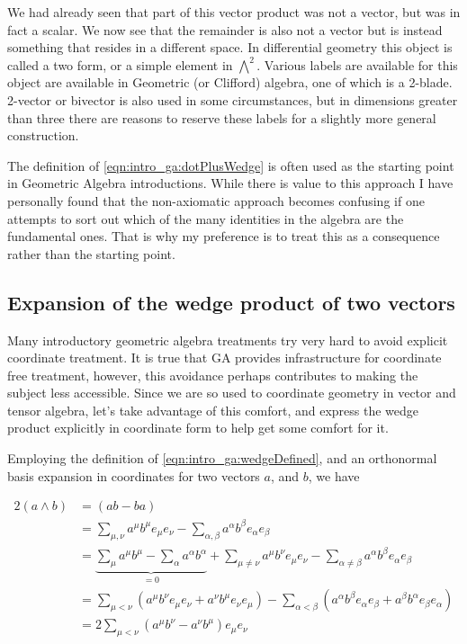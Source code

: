 We had already seen that part of this vector product was not a vector, but was in fact a scalar.  We now see that the remainder is also not a vector but is instead something that resides in a different space.  In differential geometry this object is called a two form, or a simple element in $\bigwedge^2$.  Various labels are available for this object are available in Geometric (or Clifford) algebra, one of which is a 2-blade.  2-vector or bivector is also used in some circumstances, but in dimensions greater than three there are reasons to reserve these labels for a slightly more general construction.

The definition of \ref{eqn:intro_ga:dotPlusWedge} is often used as the starting point in Geometric Algebra introductions.  While there is value to this approach I have personally found that the non-axiomatic approach becomes confusing if one attempts to sort out which of the many identities in the algebra are the fundamental ones.  That is why my preference is to treat this as a consequence rather than the starting point.

\subsection{Expansion of the wedge product of two vectors }

Many introductory geometric algebra treatments try very hard to avoid explicit coordinate treatment.  It is true that GA provides infrastructure for coordinate free treatment, however, this avoidance perhaps contributes to making the subject less accessible.  Since we are so used to coordinate geometry in vector and tensor algebra, let's take advantage of this comfort, and express the wedge product explicitly in coordinate form to help get some comfort for it.

Employing the definition of \ref{eqn:intro_ga:wedgeDefined}, and an orthonormal basis
expansion in 
coordinates for two vectors $a$, and $b$, we have

\begin{align*}
2 (a \wedge b)
&= ( a b - b a ) \\
&= 
\sum_{\mu,\nu} a^\mu b^\mu e_\mu e_\nu 
-\sum_{\alpha,\beta} a^\alpha b^\beta e_\alpha e_\beta \\
&= 
\underbrace{\sum_{\mu} a^\mu b^\mu 
- \sum_{\alpha} a^\alpha b^\alpha }_{=0}
+ \sum_{\mu \ne \nu} a^\mu b^\nu e_\mu e_\nu 
- \sum_{\alpha \ne \beta} a^\alpha b^\beta e_\alpha e_\beta \\
&=
\sum_{\mu < \nu} (a^\mu b^\nu e_\mu e_\nu + a^\nu b^\mu e_\nu e_\mu)
- \sum_{\alpha < \beta} (a^\alpha b^\beta e_\alpha e_\beta + a^\beta b^\alpha e_\beta e_\alpha )
\\
&=
2 \sum_{\mu < \nu} ( a^\mu b^\nu - a^\nu b^\mu ) e_\mu e_\nu 
\end{align*}

